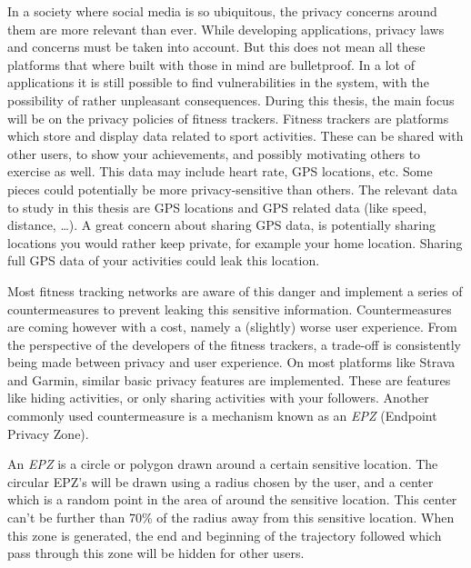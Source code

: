 In a society where social media is so ubiquitous, the privacy concerns around
them are more relevant than ever. While developing applications, privacy laws
and concerns must be taken into account. But this does not mean all these
platforms that where built with those in mind are bulletproof. In a lot of
applications it is still possible to find vulnerabilities in the system, with
the possibility of rather unpleasant consequences. During this thesis, the main
focus will be on the privacy policies of fitness trackers. Fitness trackers are
platforms which store and display data related to sport activities. These can
be shared with other users, to show your achievements, and possibly motivating
others to exercise as well. This data may include heart rate, GPS locations,
etc. Some pieces could potentially be more privacy-sensitive than others. The
relevant data to study in this thesis are GPS locations and GPS related data
(like speed, distance, \ldots). A great concern about sharing GPS data, is
potentially sharing locations you would rather keep private, for example your
home location. Sharing full GPS data of your activities could leak this
location.

Most fitness tracking networks are aware of this danger and implement a series
of countermeasures to prevent leaking this sensitive information.
Countermeasures are coming however with a cost, namely a (slightly) worse user
experience. From the perspective of the developers of the fitness trackers, a
trade-off is consistently being made between privacy and user experience. On
most platforms like Strava and Garmin, similar basic privacy features are
implemented. These are features like hiding activities, or only sharing
activities with your followers. Another commonly used countermeasure is a
mechanism known as an \textit{EPZ} (Endpoint Privacy Zone).

An \textit{EPZ} is a circle or polygon drawn around a certain sensitive
location. The circular EPZ's will be drawn using a radius chosen by the user,
and a center which is a random point in the area of around the sensitive
location. This center can't be further than 70\% of the radius away from this
sensitive location. When this zone is generated, the end and beginning of the
trajectory followed which pass through this zone will be hidden for other
users.

